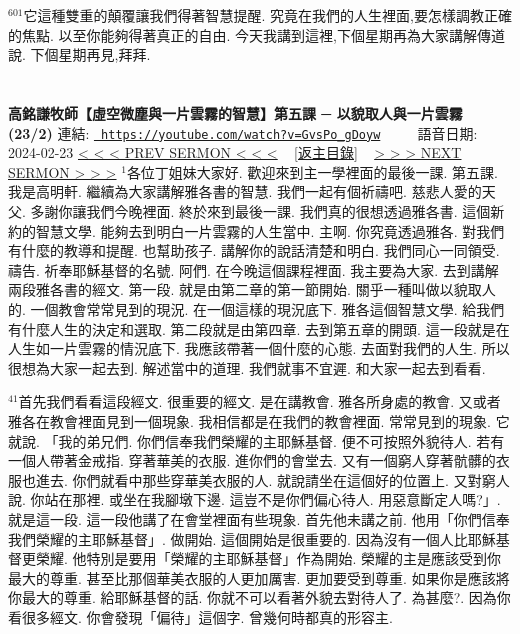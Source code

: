 \documentclass{book}
\begin{document}
$^{601}$它這種雙重的顛覆讓我們得著智慧提醒.
究竟在我們的人生裡面,要怎樣調教正確的焦點.
以至你能夠得著真正的自由.
今天我講到這裡,下個星期再為大家講解傳道說.
下個星期再見,拜拜.
\newpage



\section{}
\label{sec:GvsPo_gDoyw}
\textbf{高銘謙牧師【虛空微塵與一片雲霧的智慧】第五課 ─ 以貌取人與一片雲霧 (23/2)}
\newline
\newline
連結: \href{https://youtube.com/watch?v=GvsPo_gDoyw}{\texttt{ https://youtube.com/watch?v=GvsPo\_gDoyw}} ~~~~ 語音日期: 2024-02-23 
\newline
\newline
\hyperref[sec:3IzV5i5HZqA]{\small{< < < PREV SERMON < < <}}
~
\hyperref[sec:index]{\small{[返主目錄]}}
~
\hyperref[sec:_CzKRoa8y_w]{\small{> > > NEXT SERMON > > >}}
\newline
\newline
$^{1}$各位丁姐妹大家好.
歡迎來到主一學裡面的最後一課.
第五課.
我是高明軒.
繼續為大家講解雅各書的智慧.
我們一起有個祈禱吧.
慈悲人愛的天父.
多謝你讓我們今晚裡面.
終於來到最後一課.
我們真的很想透過雅各書.
這個新約的智慧文學.
能夠去到明白一片雲霧的人生當中.
主啊.
你究竟透過雅各.
對我們有什麼的教導和提醒.
也幫助孩子.
講解你的說話清楚和明白.
我們同心一同領受.
禱告.
祈奉耶穌基督的名號.
阿們.
在今晚這個課程裡面.
我主要為大家.
去到講解兩段雅各書的經文.
第一段.
就是由第二章的第一節開始.
關乎一種叫做以貌取人的.
一個教會常常見到的現況.
在一個這樣的現況底下.
雅各這個智慧文學.
給我們有什麼人生的決定和選取.
第二段就是由第四章.
去到第五章的開頭.
這一段就是在人生如一片雲霧的情況底下.
我應該帶著一個什麼的心態.
去面對我們的人生.
所以很想為大家一起去到.
解述當中的道理.
我們就事不宜遲.
和大家一起去到看看.

$^{41}$首先我們看看這段經文.
很重要的經文.
是在講教會.
雅各所身處的教會.
又或者雅各在教會裡面見到一個現象.
我相信都是在我們的教會裡面.
常常見到的現象.
它就說.
「我的弟兄們.
你們信奉我們榮耀的主耶穌基督.
便不可按照外貌待人.
若有一個人帶著金戒指.
穿著華美的衣服.
進你們的會堂去.
又有一個窮人穿著骯髒的衣服也進去.
你們就看中那些穿華美衣服的人.
就說請坐在這個好的位置上.
又對窮人說.
你站在那裡.
或坐在我腳墩下邊.
這豈不是你們偏心待人.
用惡意斷定人嗎?」.
就是這一段.
這一段他講了在會堂裡面有些現象.
首先他未講之前.
他用「你們信奉我們榮耀的主耶穌基督」.
做開始.
這個開始是很重要的.
因為沒有一個人比耶穌基督更榮耀.
他特別是要用「榮耀的主耶穌基督」作為開始.
榮耀的主是應該受到你最大的尊重.
甚至比那個華美衣服的人更加厲害.
更加要受到尊重.
如果你是應該將你最大的尊重.
給耶穌基督的話.
你就不可以看著外貌去對待人了.
為甚麼?.
因為你看很多經文.
你會發現「偏待」這個字.
曾幾何時都真的形容主.
\end{document}
